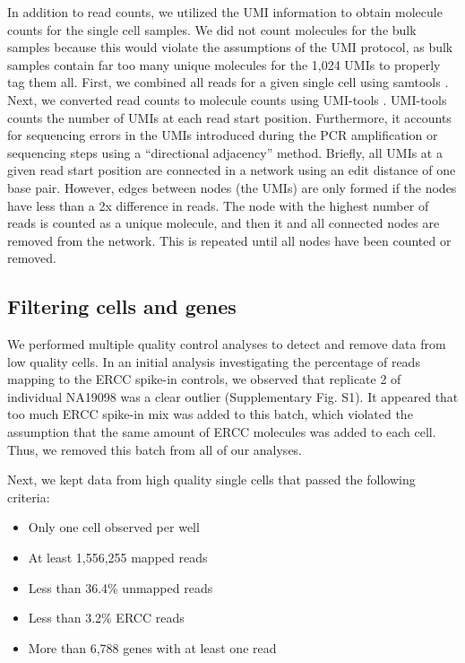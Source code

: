 In addition to read counts, we utilized the UMI information to obtain
molecule counts for the single cell samples. We did not count molecules
for the bulk samples because this would violate the assumptions of the
UMI protocol, as bulk samples contain far too many unique molecules for
the 1,024 UMIs to properly tag them all. First, we combined all reads
for a given single cell using samtools \citep{Li2009}. Next, we converted
read counts to molecule counts using UMI-tools \citep{Smith2016}.
UMI-tools counts the number of UMIs at each read start position.
Furthermore, it accounts for sequencing errors in the UMIs introduced
during the PCR amplification or sequencing steps using a ``directional
adjacency'' method. Briefly, all UMIs at a given read start position are
connected in a network using an edit distance of one base pair. However,
edges between nodes (the UMIs) are only formed if the nodes have less
than a 2x difference in reads. The node with the highest number of reads
is counted as a unique molecule, and then it and all connected nodes are
removed from the network. This is repeated until all nodes have been
counted or removed.

\subsection{Filtering cells and
genes}\label{filtering-cells-and-genes}

We performed multiple quality control analyses to detect and remove data
from low quality cells. In an initial analysis investigating the
percentage of reads mapping to the ERCC spike-in controls, we observed
that replicate 2 of individual NA19098 was a clear outlier
(Supplementary Fig. S1). It appeared that too much ERCC spike-in mix was
added to this batch, which violated the assumption that the same amount
of ERCC molecules was added to each cell. Thus, we removed this batch
from all of our analyses.

Next, we kept data from high quality single cells that passed the
following criteria:

\begin{itemize}
\itemsep1pt\parskip0pt
\item
  Only one cell observed per well
\item
  At least 1,556,255 mapped reads
\item
  Less than 36.4\% unmapped reads
\item
  Less than 3.2\% ERCC reads
\item
  More than 6,788 genes with at least one read
\end{itemize}


